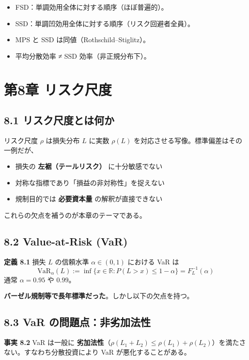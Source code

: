 \documentclass[11pt,a4paper]{report}
\begin{document}
\begin{itemize}
\item FSD：単調効用全体に対する順序（ほぼ普遍的）。
\item SSD：単調凹効用全体に対する順序（リスク回避者全員）。
\item MPS と SSD は同値（Rothschild–Stiglitz）。
\item 平均分散効率 ≠ SSD 効率（非正規分布下）。
\end{itemize}

\noindent\hrulefill

\chapter{第8章 リスク尺度}

\section{8.1 リスク尺度とは何か}

リスク尺度 $\rho$ は損失分布 $L$ に実数 $\rho(L)$ を対応させる写像。標準偏差はその一例だが、

\begin{itemize}
\item 損失の \textbf{左裾（テールリスク）} に十分敏感でない
\item 対称な指標であり「損益の非対称性」を捉えない
\item 規制目的では \textbf{必要資本量} の解釈が直接できない
\end{itemize}

これらの欠点を補うのが本章のテーマである。

\section{8.2 Value-at-Risk (VaR)}

\textbf{定義 8.1} 損失 $L$ の信頼水準 $\alpha \in (0, 1)$ における VaR は \[ \mathrm{VaR}_\alpha(L) := \inf\{ x \in \mathbb{R} : P(L > x) \le 1 - \alpha\} = F_L^{-1}(\alpha) \] 通常 $\alpha = 0.95$ や $0.99$。

\textbf{バーゼル規制等で長年標準だった}。しかし以下の欠点を持つ。

\section{8.3 VaR の問題点：非劣加法性}

\textbf{事実 8.2} VaR は一般に \textbf{劣加法性}（$\rho(L_1 + L_2) \le \rho(L_1) + \rho(L_2)$）を満たさない。すなわち分散投資により VaR が悪化することがある。
\end{document}
